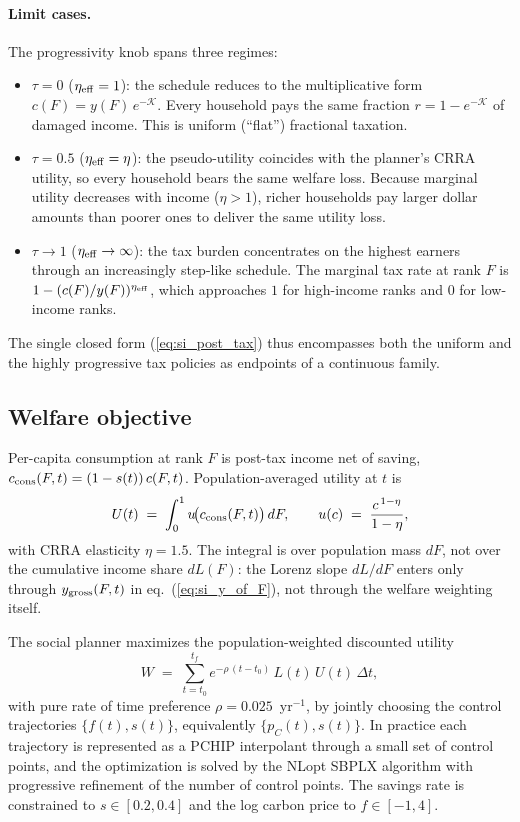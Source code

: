 \paragraph{Limit cases.}  The progressivity knob spans three regimes:
\begin{itemize}
\item $\tau = 0$ ($\eta_{\rm eff} = 1$): the schedule reduces to the multiplicative form $c(F) = y(F)\,e^{-\mathcal{K}}$.  Every household pays the same fraction $r = 1 - e^{-\mathcal{K}}$ of damaged income.  This is uniform (``flat'') fractional taxation.
\item $\tau = 0.5$ ($\eta_{\rm eff} = \eta$): the pseudo-utility coincides with the planner's CRRA utility, so every household bears the same welfare loss.  Because marginal utility decreases with income ($\eta > 1$), richer households pay larger dollar amounts than poorer ones to deliver the same utility loss.
\item $\tau \to 1$ ($\eta_{\rm eff} \to \infty$): the tax burden concentrates on the highest earners through an increasingly step-like schedule.  The marginal tax rate at rank $F$ is $1 - (c(F)/y(F))^{\eta_{\rm eff}}$, which approaches $1$ for high-income ranks and $0$ for low-income ranks.
\end{itemize}
The single closed form (\ref{eq:si_post_tax}) thus encompasses both the uniform and the highly progressive tax policies as endpoints of a continuous family.

\subsection*{Welfare objective}\label{si:welfare}

Per-capita consumption at rank $F$ is post-tax income net of saving, $c_{\rm cons}(F, t) = (1 - s(t))\, c(F, t)$.  Population-averaged utility at $t$ is
\begin{equation}\label{eq:si_U_t}
U(t) \;=\; \int_{0}^{1} u\!\bigl(c_{\rm cons}(F, t)\bigr)\, dF,
\qquad
u(c) \;=\; \frac{c^{\,1-\eta}}{1-\eta}, %
\end{equation}
with CRRA elasticity $\eta = 1.5$.  The integral is over population mass $dF$, not over the cumulative income share $dL(F)$: the Lorenz slope $dL/dF$ enters only through $y_{\rm gross}(F, t)$ in eq.~(\ref{eq:si_y_of_F}), not through the welfare weighting itself.

The social planner maximizes the population-weighted discounted utility
\begin{equation}\label{eq:si_W}
W \;=\; \sum_{t = t_0}^{t_f} e^{-\rho\,(t - t_0)}\, L(t)\, U(t)\, \Delta t, %
\end{equation}
with pure rate of time preference $\rho = 0.025$~yr$^{-1}$, by jointly choosing the control trajectories $\{f(t), s(t)\}$, equivalently $\{p_C(t), s(t)\}$.  In practice each trajectory is represented as a PCHIP interpolant through a small set of control points, and the optimization is solved by the NLopt SBPLX algorithm with progressive refinement of the number of control points.  The savings rate is constrained to $s \in [0.2, 0.4]$ and the log carbon price to $f \in [-1, 4]$.

